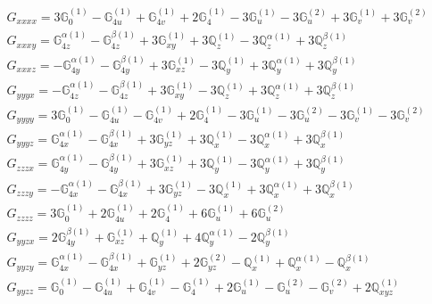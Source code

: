 \documentclass[fleqn,8pt,landscape]{jsarticle}
\begin{document}
\begin{align*}
& G_{xxxx} = 3 \mathbb{G}_{0}^{(1)} - \mathbb{G}_{4u}^{(1)} + \mathbb{G}_{4v}^{(1)} + 2 \mathbb{G}_{4}^{(1)} - 3 \mathbb{G}_{u}^{(1)} - 3 \mathbb{G}_{u}^{(2)} + 3 \mathbb{G}_{v}^{(1)} + 3 \mathbb{G}_{v}^{(2)} \\
& G_{xxxy} = \mathbb{G}_{4z}^{\alpha(1)} - \mathbb{G}_{4z}^{\beta(1)} + 3 \mathbb{G}_{xy}^{(1)} + 3 \mathbb{Q}_{z}^{(1)} - 3 \mathbb{Q}_{z}^{\alpha(1)} + 3 \mathbb{Q}_{z}^{\beta(1)} \\
& G_{xxxz} = - \mathbb{G}_{4y}^{\alpha(1)} - \mathbb{G}_{4y}^{\beta(1)} + 3 \mathbb{G}_{xz}^{(1)} - 3 \mathbb{Q}_{y}^{(1)} + 3 \mathbb{Q}_{y}^{\alpha(1)} + 3 \mathbb{Q}_{y}^{\beta(1)} \\
& G_{yyyx} = - \mathbb{G}_{4z}^{\alpha(1)} - \mathbb{G}_{4z}^{\beta(1)} + 3 \mathbb{G}_{xy}^{(1)} - 3 \mathbb{Q}_{z}^{(1)} + 3 \mathbb{Q}_{z}^{\alpha(1)} + 3 \mathbb{Q}_{z}^{\beta(1)} \\
& G_{yyyy} = 3 \mathbb{G}_{0}^{(1)} - \mathbb{G}_{4u}^{(1)} - \mathbb{G}_{4v}^{(1)} + 2 \mathbb{G}_{4}^{(1)} - 3 \mathbb{G}_{u}^{(1)} - 3 \mathbb{G}_{u}^{(2)} - 3 \mathbb{G}_{v}^{(1)} - 3 \mathbb{G}_{v}^{(2)} \\
& G_{yyyz} = \mathbb{G}_{4x}^{\alpha(1)} - \mathbb{G}_{4x}^{\beta(1)} + 3 \mathbb{G}_{yz}^{(1)} + 3 \mathbb{Q}_{x}^{(1)} - 3 \mathbb{Q}_{x}^{\alpha(1)} + 3 \mathbb{Q}_{x}^{\beta(1)} \\
& G_{zzzx} = \mathbb{G}_{4y}^{\alpha(1)} - \mathbb{G}_{4y}^{\beta(1)} + 3 \mathbb{G}_{xz}^{(1)} + 3 \mathbb{Q}_{y}^{(1)} - 3 \mathbb{Q}_{y}^{\alpha(1)} + 3 \mathbb{Q}_{y}^{\beta(1)} \\
& G_{zzzy} = - \mathbb{G}_{4x}^{\alpha(1)} - \mathbb{G}_{4x}^{\beta(1)} + 3 \mathbb{G}_{yz}^{(1)} - 3 \mathbb{Q}_{x}^{(1)} + 3 \mathbb{Q}_{x}^{\alpha(1)} + 3 \mathbb{Q}_{x}^{\beta(1)} \\
& G_{zzzz} = 3 \mathbb{G}_{0}^{(1)} + 2 \mathbb{G}_{4u}^{(1)} + 2 \mathbb{G}_{4}^{(1)} + 6 \mathbb{G}_{u}^{(1)} + 6 \mathbb{G}_{u}^{(2)} \\
& G_{yyzx} = 2 \mathbb{G}_{4y}^{\beta(1)} + \mathbb{G}_{xz}^{(1)} + \mathbb{Q}_{y}^{(1)} + 4 \mathbb{Q}_{y}^{\alpha(1)} - 2 \mathbb{Q}_{y}^{\beta(1)} \\
& G_{yyzy} = \mathbb{G}_{4x}^{\alpha(1)} - \mathbb{G}_{4x}^{\beta(1)} + \mathbb{G}_{yz}^{(1)} + 2 \mathbb{G}_{yz}^{(2)} - \mathbb{Q}_{x}^{(1)} + \mathbb{Q}_{x}^{\alpha(1)} - \mathbb{Q}_{x}^{\beta(1)} \\
& G_{yyzz} = \mathbb{G}_{0}^{(1)} - \mathbb{G}_{4u}^{(1)} + \mathbb{G}_{4v}^{(1)} - \mathbb{G}_{4}^{(1)} + 2 \mathbb{G}_{u}^{(1)} - \mathbb{G}_{u}^{(2)} - \mathbb{G}_{v}^{(2)} + 2 \mathbb{Q}_{xyz}^{(1)} \\

\end{align*}
\end{document}
